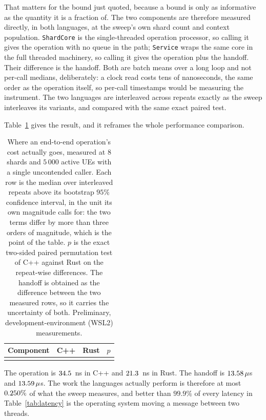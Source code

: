 \documentclass[english,twoside,openright,a4paper,censored,csm,software-track-2020]{HYthesisML}
\begin{document}
That matters for the bound just quoted, because a bound is only as informative as the quantity
it is a fraction of. The two components are therefore measured directly, in both languages, at
the sweep's own shard count and context population. \texttt{ShardCore} is the single-threaded
operation processor, so calling it gives the operation with no queue in the path;
\texttt{Service} wraps the same core in the full threaded machinery, so calling it gives the
operation plus the handoff. Their difference is the handoff. Both are batch means over a long
loop and not per-call medians, deliberately: a clock read costs tens of nanoseconds, the
same order as the operation itself, so per-call timestamps would be measuring the instrument.
The two languages are interleaved across \BudgetRepeats{} repeats exactly as the sweep
interleaves its variants, and compared with the same exact paired test.

Table~\ref{tab:budget} gives the result, and it reframes the whole performance comparison.

\begin{table}
\centering
\small
\caption[Where an end-to-end operation's cost actually goes]{Where an end-to-end operation's cost actually goes, measured at $8$ shards and
$5\,000$ active UEs with a single uncontended caller. Each row is the median over
\BudgetRepeats{} interleaved repeats above its bootstrap $95\%$ confidence interval, in the
unit its own magnitude calls for: the two terms differ by more than three orders of magnitude,
which is the point of the table. $p$ is the exact two-sided paired permutation test of C++
against Rust on the repeat-wise differences. The handoff is obtained as the difference between
the two measured rows, so it carries the uncertainty of both. Preliminary,
development-environment (WSL2) measurements.\label{tab:budget}}
\begin{tabular}{@{}l r r r@{}}
\hline\hline
Component & C++ & Rust & $p$ \\
\hline
\\
\hline
\end{tabular}
\end{table}

The operation is $34.5$~ns in C++ and $21.3$~ns in Rust. The handoff is
$13.58\,\mu$s and $13.59\,\mu$s. The work the languages actually
perform is therefore at most $0.250\%$ of what the sweep measures, and better
than $99.9\%$ of every latency in Table~\ref{tab:latency} is the operating system moving a
message between two threads.
\end{document}
